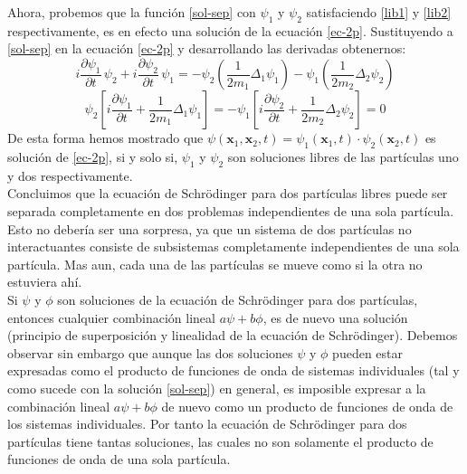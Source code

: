 \documentclass[12pt]{book}
\numberwithin{equation}{chapter}
\def\x{\mathbf{x}}
\begin{document}
Ahora, probemos que la funci\'on \eqref{sol-sep} con $\psi_{1}$ y $\psi_{2}$ satisfaciendo \eqref{lib1} y \eqref{lib2} respectivamente, es en efecto una soluci\'on de la ecuaci\'on \eqref{ec-2p}. Sustituyendo a \eqref{sol-sep} en la ecuaci\'on \eqref{ec-2p} y desarrollando las derivadas obtenernos:
\begin{equation}
i \frac{ \partial \psi_{1} }{\partial t} \, \psi_{2} + i \frac{ \partial \psi_{2} }{\partial t} \, \psi_{1} = - \psi_{2} \left( \frac{1}{2m_{1}} \Delta_{1} \psi_{1} \right) - \psi_{1} \left( \frac{1}{2m_{2}} \Delta_{2} \psi_{2} \right)
\end{equation}
\begin{equation}
\psi_{2} \left[ i \frac{\partial \psi_{1}}{\partial t} + \frac{1}{2m_{1}} \Delta_{1} \psi_{1} \right] = - \psi_{1} \left[ i \frac{\partial \psi_{2}}{\partial t} + \frac{1}{2m_{2}} \Delta_{2} \psi_{2} \right]=0
\end{equation}
De esta forma hemos mostrado que $\psi (\x_{1} , \x_{2},t) = \psi_{1} (\x_{1},t) \cdot \psi_{2} (\x_{2},t)$ es soluci\'on de \eqref{ec-2p}, si y solo si, $\psi_{1}$ y $\psi_{2}$ son soluciones libres de las part\'iculas uno y dos respectivamente.\\
Concluimos que la ecuaci\'on de Schr\"odinger para dos part\'iculas libres puede ser separada completamente en dos problemas independientes de una sola part\'icula. Esto no deber\'ia ser una sorpresa, ya que un sistema de dos part\'iculas no interactuantes consiste de subsistemas completamente independientes de una sola part\'icula. Mas aun, cada una de las part\'iculas se mueve como si la otra no estuviera ah\'i.\\
Si $\psi$ y $\phi$ son soluciones de la ecuaci\'on de Schr\"odinger para dos part\'iculas, entonces cualquier combinaci\'on lineal $ a\psi + b \phi $, es de nuevo una soluci\'on (principio de superposici\'on y linealidad de la ecuaci\'on de Schr\"odinger). Debemos observar sin embargo que aunque las dos soluciones $\psi$ y $\phi$ pueden estar expresadas como el producto de funciones de onda de sistemas individuales (tal y como sucede con la soluci\'on \eqref{sol-sep}) en general, es imposible expresar a la combinaci\'on lineal $a\psi + b \phi$ de nuevo como un producto de funciones de onda de los sistemas individuales. Por tanto la ecuaci\'on de Schr\"odinger para dos part\'iculas tiene tantas soluciones, las cuales no son solamente el producto de funciones de onda de una sola part\'icula.
\end{document}
